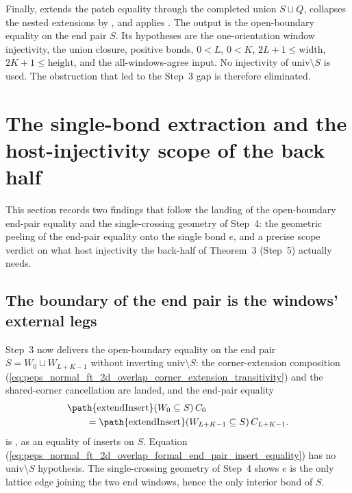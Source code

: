 \documentclass{article}
\begin{document}
Finally,  extends the patch equality through
the completed union $S\sqcup Q$, collapses the nested extensions by
, and applies . The output
is the open-boundary equality on the end pair $S$. Its hypotheses are the
one-orientation window injectivity, the union closure, positive bonds,
$0<L$, $0<K$, $2L+1\le\mathrm{width}$, $2K+1\le\mathrm{height}$, and
the all-windows-agree input. No injectivity of $\mathrm{univ}\setminus S$ is
used. The obstruction that led to the Step~3 gap is therefore eliminated.

\section{The single-bond extraction and the host-injectivity scope of the
  back half}

This section records two findings that follow the landing of the open-boundary
end-pair equality  and the single-crossing
geometry of Step~4: the geometric peeling of the end-pair equality onto the
single bond $e$, and a precise scope verdict on what host injectivity the
back-half of Theorem~3 (Step~5) actually needs.

\subsection{The boundary of the end pair is the windows' external legs}

Step~3 now delivers the open-boundary equality on the end pair $S = W_0 \sqcup
    W_{L+K-1}$ without inverting $\mathrm{univ}\setminus S$: the corner-extension
composition
(\ref{eq:peps_normal_ft_2d_overlap_corner_extension_transitivity}) and the
shared-corner cancellation
 are landed, and the end-pair equality
\begin{align}
    &\text{\path{extendInsert}}(W_0\subseteq S)\,C_0
    \notag\\
    &\qquad = \text{\path{extendInsert}}(W_{L+K-1}\subseteq S)\,C_{L+K-1}.
    \label{eq:peps_normal_ft_2d_overlap_formal_end_pair_insert_equality}
\end{align}
is , as an equality of inserts on $S$. Equation
(\ref{eq:peps_normal_ft_2d_overlap_formal_end_pair_insert_equality}) has no
$\mathrm{univ}\setminus S$
hypothesis. The single-crossing geometry of Step~4 shows $e$ is the only lattice
edge joining the two end windows, hence the only interior bond of $S$.
\end{document}

